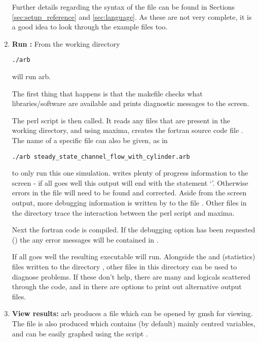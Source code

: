 \begin{enumerate}
Further details regarding the syntax of the  file can be found in Sections \ref{sec:setup_reference} and \ref{sec:language}.  As these are not very complete, it is a good idea to look through the example files too.

\item  \textbf{Run :} From the working directory
%
\begin{verbatim}
./arb
\end{verbatim}
%
will run arb.

The first thing that happens is that the makefile checks what libraries/software are available and prints diagnostic messages to the screen.

The perl script  is then called.  It reads any  files that are present in the working directory, and using maxima, creates the fortran source code file .  The name of a specific  file can also be given, as in
%
\begin{verbatim}
./arb steady_state_channel_flow_with_cylinder.arb
\end{verbatim}
%
to only run this one simulation.   writes plenty of progress information to the screen - if all goes well this output will end with the statement `'.  Otherwise errors in the  file will need to be found and corrected.  Aside from the screen output, more debugging information is written by  to the file .  Other files in the  directory trace the interaction between the perl script and maxima.

Next the fortran code is compiled.  If the debugging option has been requested () the any error messages will be contained in .

If all goes well the resulting executable will run.  Alongside the  and  (statistics) files written to the directory , other files in this directory can be used to diagnose problems.  If these don't help, there are many  and  logicals scattered through the code, and in  there are options to print out alternative output files.

\item  \textbf{View results:}  arb produces a file  which can be opened by gmsh for viewing.  The file  is also produced which contains (by default) mainly  centred variables, and can be easily graphed using the script .


\end{enumerate}
